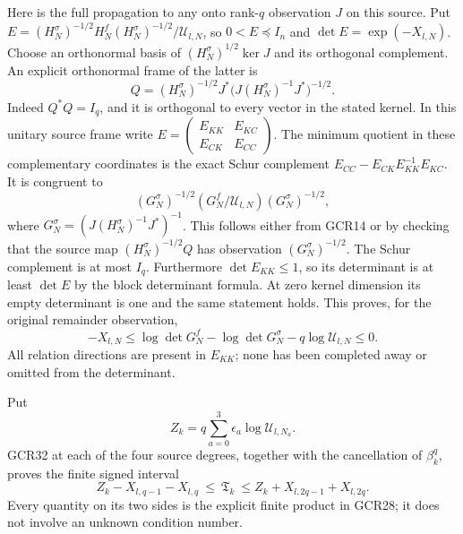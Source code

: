 Here is the full propagation to any onto rank-$q$ observation
$J$ on this source. Put
$E=(H_N^\sigma)^{-1/2}H_N^f(H_N^\sigma)^{-1/2}/
\mathscr U_{l,N}$, so $0<E\preceq I_n$ and
$\det E=\exp(-X_{l,N})$.
Choose an orthonormal basis of
$(H_N^\sigma)^{1/2}\ker J$ and its orthogonal complement.
An explicit orthonormal frame of the latter is
\[
 Q=(H_N^\sigma)^{-1/2}J^*
        \bigl(J(H_N^\sigma)^{-1}J^*\bigr)^{-1/2}.
\tag{GCR31}
\]
Indeed $Q^*Q=I_q$, and it is orthogonal to every vector in the
stated kernel. In this unitary source frame write
$E=\left(\begin{smallmatrix}E_{KK}&E_{KC}\\
E_{CK}&E_{CC}\end{smallmatrix}\right)$.
The minimum quotient in these complementary coordinates is
the exact Schur complement
$E_{CC}-E_{CK}E_{KK}^{-1}E_{KC}$. It is congruent to
\[
 (G_N^\sigma)^{-1/2}
       (G_N^f/\mathscr U_{l,N})(G_N^\sigma)^{-1/2},
\]
where $G_N^\sigma=(J(H_N^\sigma)^{-1}J^*)^{-1}$.
This follows either from GCR14 or by checking that the source
map $(H_N^\sigma)^{-1/2}Q$ has observation
$(G_N^\sigma)^{-1/2}$. The Schur complement is at most $I_q$.
Furthermore $\det E_{KK}\leq1$, so its determinant is at least
$\det E$ by the block determinant formula. At zero kernel
dimension its empty determinant is one and the same statement
holds. This proves, for the original remainder observation,
\[
 -X_{l,N}\leq
 \log\det G_N^f-\log\det G_N^\sigma
                      -q\log\mathscr U_{l,N}\leq0.
\tag{GCR32}
\]
All relation directions are present in $E_{KK}$; none has been
completed away or omitted from the determinant.

Put
\[
 Z_k=q\sum_{a=0}^3\epsilon_a\log\mathscr U_{l,N_a}.
\]
GCR32 at each of the four source degrees, together with the
cancellation of $\beta_k^q$, proves the finite signed interval
\[
 \boxed{\quad
 Z_k-X_{l,q-1}-X_{l,q}
      \ \leq\ \mathfrak T_k\
      \leq Z_k+X_{l,2q-1}+X_{l,2q}.
 \quad}\tag{GCR33}
\]
Every quantity on its two sides is the explicit finite product
in GCR28; it does not involve an unknown condition number.

